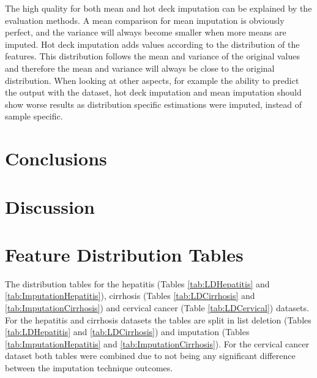 \documentclass[10pt,a4paper]{article}
\begin{document}
	The high quality for both mean and hot deck imputation can be explained by the evaluation methods. A mean comparison for mean imputation is obviously perfect, and the variance will always become smaller when more means are imputed. Hot deck imputation adds values according to the distribution of the features. This distribution follows the mean and variance of the original values and therefore the mean and variance will always be close to the original distribution. When looking at other aspects, for example the ability to predict the output with the dataset, hot deck imputation and mean imputation should show worse results as distribution specific estimations were imputed, instead of sample specific.
	
	\section{Conclusions}
	\label{sec:Conclusions}
	
	\section{Discussion}
	\label{sec:Discussion}
	
	 
	
	
	\appendix
	
	\section{Feature Distribution Tables}
	\label{app:DistributionTables}
	
	The distribution tables for the hepatitis (Tables \ref{tab:LDHepatitis} and \ref{tab:ImputationHepatitis}), cirrhosis (Tables \ref{tab:LDCirrhosis} and \ref{tab:ImputationCirrhosis}) and cervical cancer (Table \ref{tab:LDCervical}) datasets. For the hepatitis and cirrhosis datasets the tables are split in list deletion (Tables \ref{tab:LDHepatitis} and \ref{tab:LDCirrhosis}) and imputation (Tables \ref{tab:ImputationHepatitis} and \ref{tab:ImputationCirrhosis}). For the cervical cancer dataset both tables were combined due to not being any significant difference between the imputation technique outcomes. 
	
\end{document}
